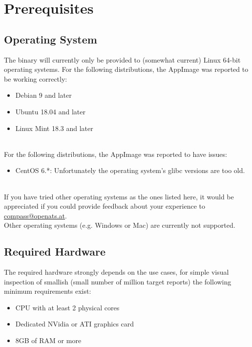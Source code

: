 \section{Prerequisites}

\subsection{Operating System}

The binary will currently only be provided to (somewhat current) Linux 64-bit operating systems. For the following distributions, the AppImage was reported to be working correctly:

\begin{itemize}  
\item Debian 9 and later
\item Ubuntu 18.04 and later
\item Linux Mint 18.3 and later
\end{itemize}
\ \\

For the following distributions, the AppImage was reported to have issues:

\begin{itemize}  
\item CentOS 6.*: Unfortunately the operating system's glibc versions are too old.
\end{itemize}
\ \\

If you have tried other operating systems as the ones listed here, it would be appreciated if you could provide feedback about your experience to \href{mailto:compass@openats.at}{compass@openats.at}.\\

Other operating systems (e.g. Windows or Mac) are currently not supported.

\subsection{Required Hardware}

The required hardware strongly depends on the use cases, for simple visual inspection of smallish (small number of million target reports) the following minimum requirements exist:

\begin{itemize}  
\item CPU with at least 2 physical cores
\item Dedicated NVidia or ATI graphics card
\item 8GB of RAM or more
\end{itemize}
\ \\

